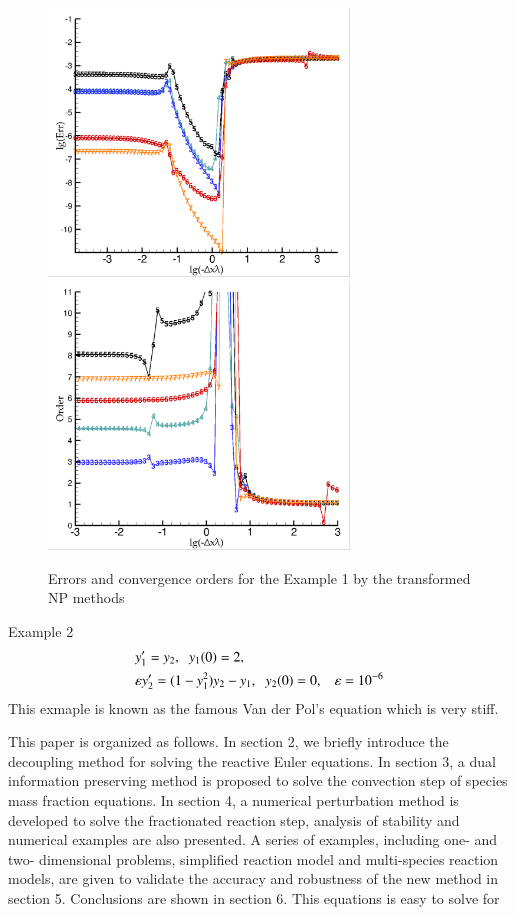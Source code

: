 \documentclass[review]{elsarticle}
\theoremstyle{plain}\newtheorem{definition}{\sc{Definition}}
\theoremstyle{defination}\newtheorem{example}{Example}[section]
\numberwithin{equation}{section}
\numberwithin{table}{section}
\begin{document}
{\begin{figure}
  \centering
  \includegraphics[width=8cm]{NPT_Err.png}
  \includegraphics[width=8cm]{NPT_order.png}
	\caption{Errors and convergence orders for the Example 1 by  the transformed  NP methods }
	\label{Fig:seinfeldNPT}
  \end{figure}

  Example 2 \cite{HairerE1988Er,Hairer1999Stiff}
  \begin{equation}
	\begin{aligned}
	&y_1'=y_2,\hspace{0.2cm} y_1(0)=2,\\
	&\varepsilon y_2'=(1-y_1^2)y_2-y_1, \hspace{0.2cm}y_2(0)=0,\hspace{0.3cm} \varepsilon=10^{-6}
   \end{aligned}
 \end{equation}
 This exmaple is known as the famous Van der Pol's equation which is very stiff.



This paper is organized as follows. In section 2, we briefly introduce the decoupling method for solving the reactive Euler equations. In section 3, a dual information preserving method is proposed to solve the convection step of species mass fraction equations. In section 4, a numerical perturbation method is developed to solve the fractionated reaction step, analysis of stability and numerical examples are also presented. A series of examples, including one- and two- dimensional problems, simplified reaction model and multi-species reaction models, are given to validate the accuracy and robustness of the new method in section 5. Conclusions are shown in section 6.
This equations is easy to solve for  



}
\end{document}
